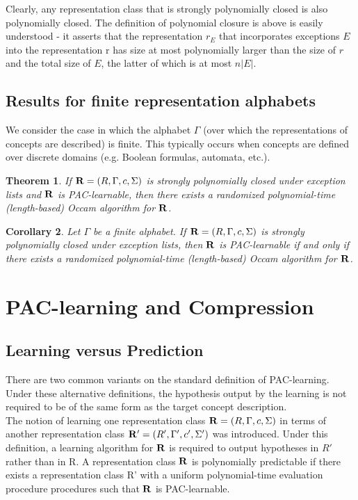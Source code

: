 \documentclass[12pt]{article}
\newtheorem{theorem}{Theorem}
\newtheorem{corollary}[theorem]{Corollary}
\begin{document}
Clearly, any representation class that is strongly polynomially closed
is also polynomially closed. The definition of polynomial closure is
above is easily understood - it asserts that the representation $r_E$
that incorporates exceptions $E$ into the representation r has size at
most polynomially larger than the size of $r$ and the total size of
$E$, the latter of which is at most $n|E|$.

\subsection{Results for finite representation alphabets}

We consider the case in which the alphabet $\Gamma$ (over which the
representations of concepts are described) is finite. This typically
occurs when concepts are defined over discrete domains (e.g. Boolean
formulas, automata, etc.).

\begin{theorem}
If ${\bf R} = (R, \Gamma, c, \Sigma)$ is strongly polynomially closed
under exception lists and ${\bf R}$ is PAC-learnable, then there
exists a randomized polynomial-time (length-based) Occam algorithm for
${\bf R}$.
\end{theorem}

\begin{corollary}
Let $\Gamma$ be a finite alphabet. If ${\bf R} = (R, \Gamma, c,
\Sigma)$ is strongly polynomially closed under exception lists, then
${\bf R}$ is PAC-learnable if and only if there exists a randomized
polynomial-time (length-based) Occam algorithm for ${\bf R}$.
\end{corollary}

\section{PAC-learning and Compression}

\subsection{Learning versus Prediction}

There are two common variants on the standard definition of
PAC-learning. Under these alternative definitions, the hypothesis
output by the learning is not required to be of the same form as the
target concept description. \\

The notion of learning one representation class ${\bf R} = (R, \Gamma,
c, \Sigma)$ in terms of another representation class ${\bf R'} = (R',
\Gamma', c', \Sigma')$ was introduced. Under this definition, a
learning algorithm for ${\bf R}$ is required to output hypotheses in
$R'$ rather than in R. A representation class ${\bf R}$ is
polynomially predictable if there exists a representation class R'
with a uniform polynomial-time evaluation procedure procedures such
that ${\bf R}$ is PAC-learnable.
\end{document}

